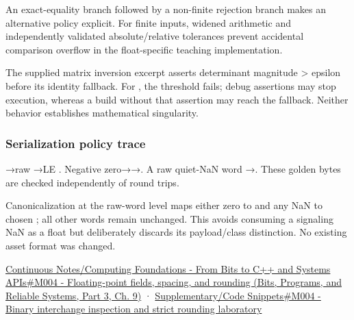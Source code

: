 An exact-equality branch followed by a non-finite rejection branch makes an alternative policy explicit. For finite inputs, widened arithmetic and independently validated absolute/relative tolerances prevent accidental comparison overflow in the float-specific teaching implementation.

The supplied matrix inversion excerpt asserts determinant magnitude \textgreater{} epsilon before its identity fallback. For , the threshold fails; debug assertions may stop execution, whereas a build without that assertion may reach the fallback. Neither behavior establishes mathematical singularity.

\subsubsection{Serialization policy trace}\label{appendix-92ff77d4dfdc-serialization-policy-trace}

\hypertarget{appendix-92ff77d4dfdc-serialization-policy-trace}{}

→raw →LE . Negative zero→→. A raw quiet-NaN word →. These golden bytes are checked independently of round trips.

Canonicalization at the raw-word level maps either zero to  and any NaN to chosen ; all other words remain unchanged. This avoids consuming a signaling NaN as a float but deliberately discards its payload/class distinction. No existing asset format was changed.

\href{../01-Bits-Programs-and-Reliable-Systems-P03/main.pdf\#nameddest=01-foundations-i-ch011-m004---floating-point-fields-spacing-and-rounding}{Continuous Notes/Computing Foundations - From Bits to C++ and Systems APIs\#M004 - Floating-point fields, spacing, and rounding (Bits, Programs, and Reliable Systems, Part 3, Ch. 9)} · \hyperref[appendix-4e2236f53445-m004---binary-interchange-inspection-and-strict-rounding-laboratory]{Supplementary/Code Snippets\#M004 - Binary interchange inspection and strict rounding laboratory}


